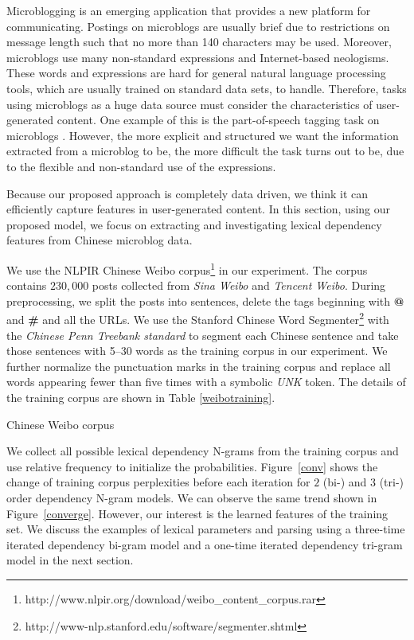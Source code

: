 \documentclass[english]{jnlp_1.4}
\begin{document}
Microblogging is an emerging application that provides a new platform for communicating. Postings on microblogs are usually brief due to restrictions on message length such that no more than 140 characters may be used. Moreover, microblogs use many non-standard expressions and Internet-based neologisms. These words and expressions are hard for general natural language processing tools, which are usually trained on standard data sets, to handle.
Therefore, tasks using microblogs as a huge data source must consider the characteristics of user-generated content. One example of this is the part-of-speech tagging task on microblogs \cite{gimpel2010part}. However, the more explicit and structured we want the information extracted from a microblog to be, the more difficult the task turns out to be, due to the flexible and non-standard use of the expressions. 


Because our proposed approach is completely data driven, we think it can efficiently capture features in user-generated content. In this section, using our proposed model, we focus on extracting and investigating lexical dependency features from Chinese microblog data.

We use the NLPIR Chinese Weibo corpus\footnote{http://www.nlpir.org/download/weibo\_content\_corpus.rar} in our experiment. The corpus contains $230,000$ posts collected from {\em Sina Weibo} and {\em Tencent Weibo}. During preprocessing, we split the posts into sentences, delete the tags beginning with {\bf @} and {\bf \#} and all the URLs. We use the Stanford Chinese Word Segmenter\footnote{http://www-nlp.stanford.edu/software/segmenter.shtml} \cite{tseng2005conditional} with the {\em  Chinese Penn Treebank standard} to segment each Chinese sentence and take those sentences with 5--30 words as the training corpus in our experiment. We further normalize the punctuation marks in the training corpus and replace all words appearing fewer than five times with a symbolic {\em UNK} token. The details of the training corpus are shown in Table \ref{weibotraining}.

\begin{table}[t]
\caption{Chinese Weibo corpus}
\label{weibotraining}

\end{table}

We collect all possible lexical dependency N-grams from the training corpus and use relative frequency to initialize the probabilities. Figure~\ref{conv} shows the change of training corpus perplexities before each iteration for $2$ (bi-) and $3$ (tri-) order dependency N-gram models. We can observe the same trend shown in Figure~\ref{converge}.
However, our interest is the learned features of the training set. We discuss the examples of lexical parameters and parsing using a three-time iterated dependency bi-gram model and a one-time iterated dependency tri-gram model in the next section. 
\end{document}
